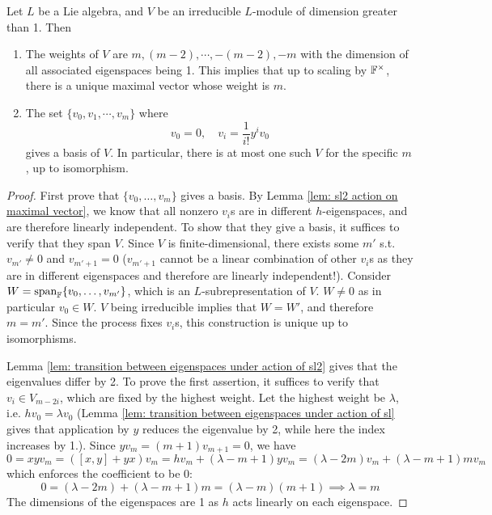 \documentclass{article}
\begin{document}
\begin{theorem}\label{thm: classification of irreducible sl2 representation}
    Let $L$ be a Lie algebra, and $V$ be an irreducible $L$-module of dimension greater than 1. Then
    \begin{enumerate}[label=\arabic*)]
        \item The weights of $V$ are $m, (m-2), \cdots, -(m-2), -m$ with the dimension of all associated eigenspaces being 1. This implies that up to scaling by $\mathbb{F}^{\times}$, there is a unique maximal vector whose weight is $m$.
        \item The set $\{v_0, v_1, \cdots, v_m\}$ where
        \[
            v_0 = 0, \quad v_i = \frac{1}{i!} y^i v_0
        \]
        gives a basis of $V$. In particular, there is at most one such $V$ for the specific $m$, up to isomorphism.
    \end{enumerate}
\end{theorem}

\begin{proof}
    First prove that $\{ v_0, \dots, v_m \}$ gives a basis. By Lemma \ref{lem: sl2 action on maximal vector}, we know that all nonzero $v_i$s are in different $h$-eigenspaces, and are therefore linearly independent. To show that they give a basis, it suffices to verify that they span $V$. Since $V$ is finite-dimensional, there exists some $m'$ s.t. $v_{m'} \neq 0$ and $v_{m'+1} = 0$ ($v_{m'+1}$ cannot be a linear combination of other $v_i$s as they are in different eigenspaces and therefore are linearly independent!). Consider $W = \mathrm{span}_{\mathbb{F}}\{ v_0, \dots, v_{m'} \}$, which is an $L$-subrepresentation of $V$. $W \neq 0$ as in particular $v_0 \in W$. $V$ being irreducible implies that $W = W'$, and therefore $m = m'$. Since the process fixes $v_i$s, this construction is unique up to isomorphisms.

    Lemma \ref{lem: transition between eigenspaces under action of sl2} gives that the eigenvalues differ by 2. To prove the first assertion, it suffices to verify that $v_i \in V_{m-2i}$, which are fixed by the highest weight. Let the highest weight be $\lambda$, i.e. $h v_0 = \lambda v_0$ (Lemma \ref{lem: transition between eigenspaces under action of sl} gives that application by $y$ reduces the eigenvalue by 2, while here the index increases by 1.). Since $y v_m = (m+1) v_{m+1} = 0$, we have
    \[
        0 = x y v_m = ([x, y] + y x) v_m = h v_m + (\lambda - m + 1) y v_m = (\lambda - 2m) v_m + (\lambda - m + 1) m v_m
    \]
    which enforces the coefficient to be 0:
    \[
        0 = (\lambda - 2m) + (\lambda - m + 1) m = (\lambda - m) (m + 1) \implies \lambda = m
    \]
    The dimensions of the eigenspaces are 1 as $h$ acts linearly on each eigenspace.
\end{proof}
\end{document}
